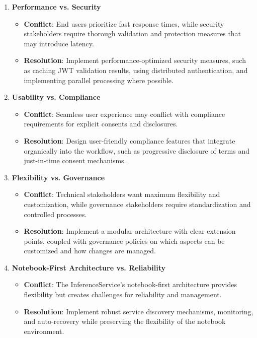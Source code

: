 \begin{enumerate}
   \item \textbf{Performance vs. Security}
   \begin{itemize}
      \item \textbf{Conflict}: End users prioritize fast response times, while security stakeholders require thorough validation and protection measures that may introduce latency.
      \item \textbf{Resolution}: Implement performance-optimized security measures, such as caching JWT validation results, using distributed authentication, and implementing parallel processing where possible.
   \end{itemize}

   \item \textbf{Usability vs. Compliance}
   \begin{itemize}
      \item \textbf{Conflict}: Seamless user experience may conflict with compliance requirements for explicit consents and disclosures.
      \item \textbf{Resolution}: Design user-friendly compliance features that integrate organically into the workflow, such as progressive disclosure of terms and just-in-time consent mechanisms.
   \end{itemize}

   \item \textbf{Flexibility vs. Governance}
   \begin{itemize}
      \item \textbf{Conflict}: Technical stakeholders want maximum flexibility and customization, while governance stakeholders require standardization and controlled processes.
      \item \textbf{Resolution}: Implement a modular architecture with clear extension points, coupled with governance policies on which aspects can be customized and how changes are managed.
   \end{itemize}

   \item \textbf{Notebook-First Architecture vs. Reliability}
   \begin{itemize}
      \item \textbf{Conflict}: The InferenceService's notebook-first architecture provides flexibility but creates challenges for reliability and management.
      \item \textbf{Resolution}: Implement robust service discovery mechanisms, monitoring, and auto-recovery while preserving the flexibility of the notebook environment.
   \end{itemize}


\end{enumerate}
